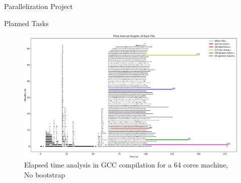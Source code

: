 \documentclass[12pt]{article}
\begin{document}
\begin{section}{Parallelization Project}
\begin{subsection}{Planned Tasks}
\begin{figure}[ht]
 \centering
 \includegraphics[scale=0.6, angle=-90]{out-crop.pdf}
 \caption{Elapsed time analysis in GCC compilation for a 64 cores machine, No bootstrap}
 \label{fig:analysis}
\end{figure}

\end{subsection}

\end{section}
\end{document}
